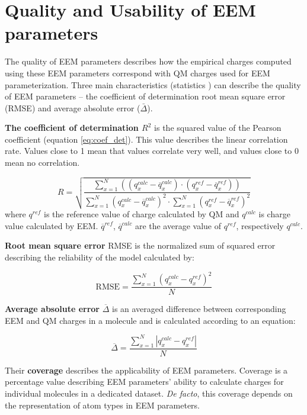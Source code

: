 \section{Quality and Usability of EEM parameters}

The quality of EEM parameters describes how the empirical charges computed
using these EEM parameters correspond with QM charges used for EEM
parameterization. Three main characteristics (statistics \cite{Urdan2011, Verzani2018})
can describe the quality of EEM parameters -- the coefficient of determination
root mean square error (RMSE) and average absolute error ($\bar{\Delta}$).

\textbf{The coefficient of determination $R^2$} is the squared value of the
Pearson coefficient (equation \ref{eq:coef_det}). This value describes the
linear correlation rate. Values close to 1 mean that values correlate very well,
and values close to 0 mean no correlation.

\begin{equation} \label{eq:coef_det}
    R = \sqrt{\frac{
        \sum^N_{x=1}{((q^{calc}_x - \overline{q}^{calc}_x) \cdot (q^{ref}_x - \overline{q}^{ref}_x))}
    }{
        \sum^N_{x=1}{(q^{calc}_x - \overline{q}^{calc}_x)^2} \cdot \sum^N_{x=1}{(q^{ref}_x - \overline{q}^{ref}_x)^2}
    }}
\end{equation}
where $q^{ref}$ is the reference value of charge calculated by QM and $q^{calc}$
is charge value calculated by EEM. $\overline{q}^{ref}$, $\overline{q}^{calc}$
are the average value of $q^{ref}$, respectively $q^{calc}$.

\textbf{Root mean square error} RMSE is the normalized sum of squared error
describing the reliability of the model calculated by:

\begin{equation}
    \mathrm{RMSE} = \frac{
        \sum^N_{x=1}{(q^{calc}_x - q^{ref}_x)^2}
    }{
        N
    }
\end{equation}

\textbf{Average absolute error} $\overline{\Delta}$ is an averaged difference
between corresponding EEM and QM charges in a molecule and is calculated
according to an equation:

\begin{equation}
    \overline{\Delta} = \frac{
        \sum^N_{x=1}{|q^{calc}_x - q^{ref}_x|}
    }{
        N
    }
\end{equation}

Their \textbf{coverage} describes the applicability of EEM parameters.
Coverage is a percentage value describing EEM parameters' ability to calculate
charges for individual molecules in a dedicated dataset. \textit{De facto},
this coverage depends on the representation of atom types in EEM parameters.


